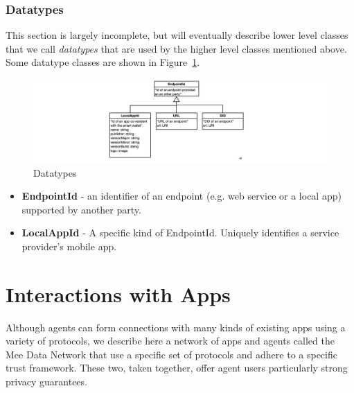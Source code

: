\documentclass[11pt, oneside]{article}   	%
\begin{document}
\subsubsection{Datatypes}

This section is largely incomplete, but will eventually describe lower level classes that we call \emph{datatypes} that are used by the higher level classes mentioned above. Some datatype classes are shown in Figure~\ref{fig:datatypes}.

\begin{figure}[htbp]
\includegraphics[width=\textwidth]{./images/datatypes.png}
\caption{Datatypes}
\label{fig:datatypes}
\end{figure}

\begin{itemize}
\item \textbf{EndpointId} -  an identifier of an endpoint (e.g. web service or a local app) supported by another party.
\item \textbf{LocalAppId} - A specific kind of EndpointId. Uniquely identifies a service provider's mobile app. 
\
\end{itemize}

\section{Interactions with Apps} %

Although agents can form connections with many kinds of existing apps using a variety of protocols, we describe here a network of apps and agents called the Mee Data Network that use a specific set of protocols and adhere to a specific trust framework. These two, taken together, offer agent users particularly strong privacy guarantees.
\end{document}
